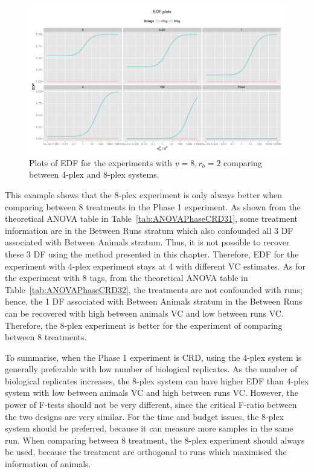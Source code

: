 \documentclass[12pt,a4paper]{article}
\begin{document}
\begin{figure}[ht]
\centering
\includegraphics[width=1 \textwidth]{Graph/CRD822Tag4vsTag8.pdf}
\caption{Plots of EDF for the experiments with $v = 8, r_b = 2$ comparing between 4-plex and 8-plex systems.}
\label{fig:compare82CRD}
\end{figure}

This example shows that the 8-plex experiment is only always better when comparing between 8 treatments in the Phase 1 experiment. As shown from the theoretical ANOVA table in Table~\ref{tab:ANOVAPhaseCRD31}, some treatment information are in the Between Runs stratum which also confounded all 3 DF associated with Between Animals stratum. Thus, it is not possible to recover these 3 DF using the method presented in this chapter. Therefore, EDF for the experiment with 4-plex experiment stays at 4 with different VC estimates. As for the experiment with 8 tags, from the theoretical ANOVA table in Table~\ref{tab:ANOVAPhaseCRD32}, the treatments are not confounded with runs; hence, the 1 DF associated with Between Animals stratum in the Between Runs can be recovered with high between animals VC and low between runs VC. Therefore, the 8-plex experiment is better for the experiment of comparing between 8 treatments.  

To summarise, when the Phase 1 experiment is CRD, using the 4-plex system is generally preferable with low number of biological replicates. As the number of  biological replicates increases, the 8-plex system can have higher EDF than 4-plex system with low between animals VC and high between runs VC. However, the power of F-tests should not be very different, since the critical F-ratio between the two designs are very similar. For the time and budget issues, the 8-plex system should be preferred, because it can measure more samples in the same run. When comparing between 8 treatment, the 8-plex experiment should always be used, because the treatment are orthogonal to runs which maximised the information of animals. 
\end{document}
